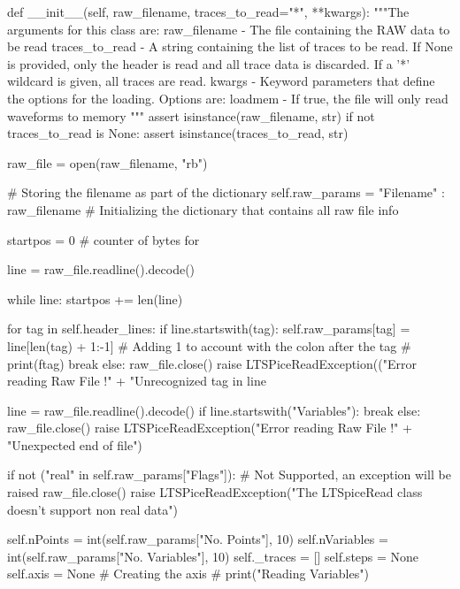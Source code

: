     def __init__(self, raw_filename, traces_to_read="*", **kwargs):
        """The arguments for this class are:
    raw_filename   - The file containing the RAW data to be read
    traces_to_read - A string containing the list of traces to be read. If None is provided, only the header is read
                     and all trace data is discarded. If a '*' wildcard is given, all traces are read.
    kwargs         - Keyword parameters that define the options for the loading. Options are:
                        loadmem - If true, the file will only read waveforms to memory
    """
        assert isinstance(raw_filename, str)
        if not traces_to_read is None:
            assert isinstance(traces_to_read, str)

        raw_file = open(raw_filename, "rb")

        # Storing the filename as part of the dictionary
        self.raw_params = { "Filename" : raw_filename } # Initializing the dictionary that contains all raw file info

        startpos = 0  # counter of bytes for

        line = raw_file.readline().decode()

        while line:
            startpos += len(line)

            for tag in self.header_lines:
                if line.startswith(tag):
                    self.raw_params[tag] = line[len(tag) + 1:-1]  # Adding 1 to account with the colon after the tag
                    # print(ftag)
                    break
            else:
                raw_file.close()
                raise LTSPiceReadException(("Error reading Raw File !\n " +
                                            "Unrecognized tag in line %

            line = raw_file.readline().decode()
            if line.startswith("Variables"):
                break
        else:
            raw_file.close()
            raise LTSPiceReadException("Error reading Raw File !\n " +
                                       "Unexpected end of file")

        if not ("real" in self.raw_params["Flags"]):
            # Not Supported, an exception will be raised
            raw_file.close()
            raise LTSPiceReadException("The LTSpiceRead class doesn't support non real data")

        self.nPoints = int(self.raw_params["No. Points"], 10)
        self.nVariables = int(self.raw_params["No. Variables"], 10)
        self._traces = []
        self.steps = None
        self.axis = None  # Creating the axis
        # print("Reading Variables")

